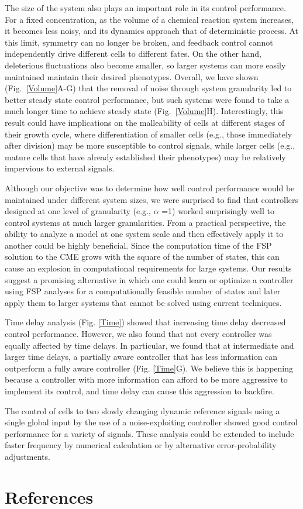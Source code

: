 \documentclass[12pt]{iopart}
\begin{document}
The size of the system also plays an important role in its control performance. 
For a fixed concentration, as the volume of a chemical reaction system increases, it becomes less noisy, and its dynamics approach that of deterministic process. 
At this limit, symmetry can no longer be broken, and feedback control cannot independently drive different cells to different fates.  
On the other hand, deleterious fluctuations also become smaller, so larger systems can more easily maintained maintain their desired phenotypes.
Overall, we have shown (Fig.\ \ref{Volume}A-G) that the removal of noise through system granularity led to better steady state control performance, but  such systems were found to take a much longer time to achieve steady state (Fig.\ \ref{Volume}H). 
Interestingly, this result could have implications on the malleability of cells at different stages of their growth cycle, where differentiation of smaller cells (e.g., those immediately after division) may be more susceptible to control signals, while larger cells (e.g., mature cells that have already established their phenotypes) may be relatively impervious to external signals.

Although our objective was to determine how well control performance would be maintained under different system sizes, we were surprised to find that controllers designed at one level of granularity (e.g., $\alpha$ =1) worked surprisingly well to control systems at much larger granularities. 
From a practical perspective, the ability to analyze a model at one system scale and then effectively apply it to another could be highly beneficial. 
Since the computation time of the FSP solution to the CME grows with the square of the number of states, this can cause an explosion in computational requirements for large systems. 
Our results suggest a promising alternative in which one could learn or optimize a controller using FSP analyses for a computationally feasible number of states and later apply them to larger systems that cannot be solved using current techniques.

Time delay analysis (Fig. \ref{Time}) showed that increasing time delay decreased control performance. However, we also found that not every controller was equally affected by time delays. In particular, we found that at intermediate and larger time delays, a partially aware controller that has  less information can outperform a fully aware controller (Fig. \ref{Time}G). We believe this is happening because a controller with more information can afford to be more aggressive to implement its control, and time delay can cause this aggression to backfire.

The control of cells to two slowly changing dynamic reference signals using a single global input by the use of a noise-exploiting controller showed good control performance for a variety of signals. These analysis could be extended to include faster frequency by numerical calculation or by alternative error-probability adjustments.



\section*{References}


\end{document}
